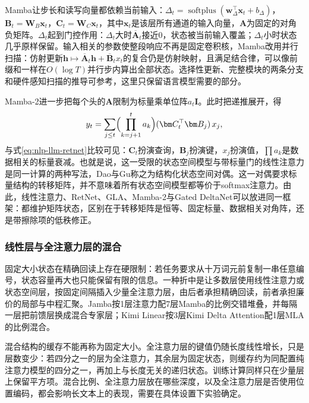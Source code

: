 Mamba让步长和读写向量都依赖当前输入：$\Delta_t=\operatorname{softplus}(\bm w_{\Delta}^{\top}\bm x_t+b_{\Delta})$，$\bm B_t=\bm W_B\bm x_t$，$\bm C_t=\bm W_C\bm x_t$，其中$\bm x_t$是该层所有通道的输入向量，$\bm A$为固定的对角负矩阵。$\Delta_t$起到门控作用：$\Delta_t$大时$\overline{\bm A}_t$接近0，状态被当前输入覆盖；$\Delta_t$小时状态几乎原样保留。输入相关的参数使整段响应不再是固定卷积核，Mamba改用并行扫描：仿射更新$\bm h\mapsto\overline{\bm A}_t\bm h+\overline{\bm B}_tx_t$的复合仍是仿射映射，且满足结合律，可以像前缀和一样在$O(\log T)$并行步内算出全部状态。选择性更新、完整模块的两条分支和硬件感知扫描的推导可参考，这里只保留语言模型需要的部分。

Mamba-2进一步把每个头的$\bm A$限制为标量乘单位阵$a_t\bm I$。此时把递推展开，得
\[
 y_t=\sum_{j\le t}\Bigl(\prod_{k=j+1}^{t}a_k\Bigr)(\bm C_t^{\top}\bm B_j)\,x_j ,
\]
与式\eqref{eq:nlp-llm-retnet}比较可见：$\bm C_t$扮演查询，$\bm B_j$扮演键，$x_j$扮演值，$\prod a_k$是数据相关的标量衰减。也就是说，这一受限的状态空间模型与带标量门的线性注意力是同一计算的两种写法，Dao与Gu称之为结构化状态空间对偶。这一对偶要求标量结构的转移矩阵，并不意味着所有状态空间模型都等价于softmax注意力。由此，线性注意力、RetNet、GLA、Mamba-2与Gated DeltaNet可以放进同一框架：都维护矩阵状态，区别在于转移矩阵是恒等、固定标量、数据相关对角阵，还是带擦除项的低秩修正。

\subsubsection{线性层与全注意力层的混合}
\label{sec:nlp-llm-hybrid-layers}

固定大小状态在精确回读上存在硬限制：若任务要求从十万词元前复制一串任意编号，状态容量再大也只能保留有限的信息。一种折中是让多数层使用线性注意力或状态空间层，按固定间隔插入少量全注意力层，由后者承担精确回读，前者承担廉价的局部与中程汇聚。Jamba按1层注意力配7层Mamba的比例交错堆叠，并每隔一层把前馈层换成混合专家层；Kimi Linear按3层Kimi Delta Attention配1层MLA的比例混合。

混合结构的缓存不能再称为固定大小。全注意力层的键值仍随长度线性增长，只是层数变少：若四分之一的层为全注意力，其余层为固定状态，则缓存约为同配置纯注意力模型的四分之一，再加上与长度无关的递归状态。训练计算同样只在少量层上保留平方项。混合比例、全注意力层放在哪些深度，以及全注意力层是否使用位置编码，都会影响长文本上的表现，需要在具体设置下实验确定。

